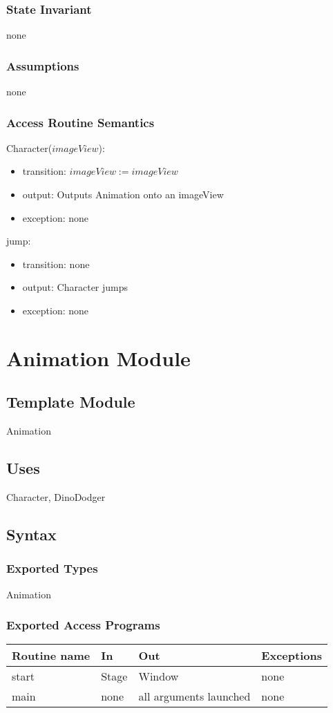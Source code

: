 \documentclass[12pt, titlepage]{article}
\begin{document}
\subsubsection {State Invariant}
none
\subsubsection {Assumptions}
none
\subsubsection {Access Routine Semantics}
Character($imageView$):
\begin{itemize}
\item transition: $imageView := imageView$ 
\item output: Outputs Animation onto an imageView
\item exception: none
\end{itemize}
\noindent jump:
\begin{itemize}
\item transition: none
\item output: Character jumps
\item exception: none
\end{itemize}

\newpage
\section {Animation Module}
\subsection{Template Module}
Animation
\subsection {Uses}
Character, DinoDodger
\subsection {Syntax}
\subsubsection {Exported Types}
Animation
\subsubsection {Exported Access Programs}
\begin{tabular}{| l | l | l | l |}
\hline
\textbf{Routine name} & \textbf{In} & \textbf{Out} & \textbf{Exceptions}\\
\hline
start & Stage & Window & none\\
\hline
main & none & all arguments launched & none\\
\hline
\end{tabular}
\end{document}
